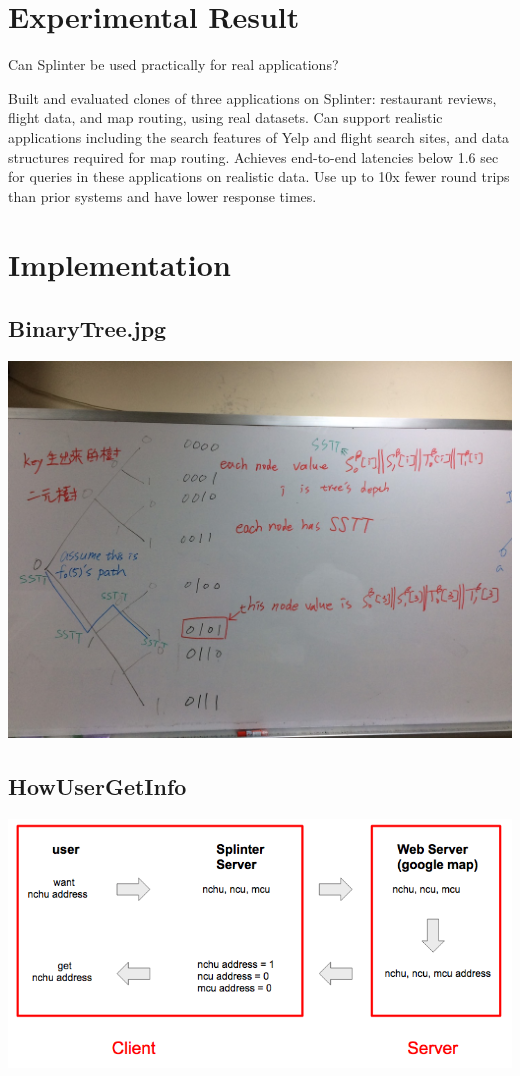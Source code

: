 \documentclass[12pt,a4paper]{article}
\begin{document}
\begin{multicols}{2}
\section{Experimental Result}
Can Splinter be used practically for real applications?  

Built and evaluated clones of three applications on Splinter: restaurant reviews, flight data, and map routing, using real datasets.
Can support realistic applications including the search features of Yelp and flight search sites, and data structures required for map routing.
Achieves end-to-end latencies below 1.6 sec for queries in these applications on realistic data.
Use up to 10x fewer round trips than prior systems and have lower response times. 
 
\section{Implementation} 
\subsection{BinaryTree.jpg}
\includegraphics[scale=0.15]{BinaryTree.jpg}
\subsection{HowUserGetInfo}
\includegraphics[scale=0.27]{HowUserGetInfo.png}

\end{multicols}
\end{document}
